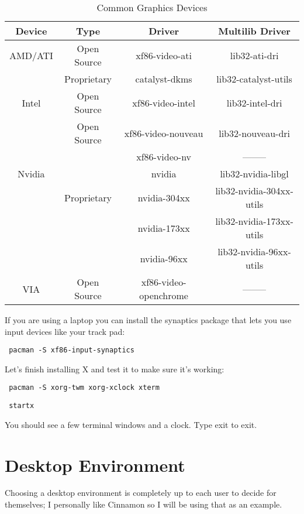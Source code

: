 \documentclass[12pt]{article}
\begin{document}
    \begin{table}[H]
        \centering
        \caption{Common Graphics Devices}
        \label{graphics_drivers}
        \begin{tabular}{|c|c|c|c|} \hline
            Device & Type & Driver & Multilib Driver \\ \hline
            AMD/ATI & Open Source & xf86-video-ati & lib32-ati-dri \\ \cline{2-4}
             & Proprietary & catalyst-dkms & lib32-catalyst-utils \\ \cline{2-4} \hline

            Intel & Open Source & xf86-video-intel & lib32-intel-dri \\ \cline{2-4} \hline

            & Open Source & xf86-video-nouveau & lib32-nouveau-dri \\ \cline{3-4}
                    & & xf86-video-nv & -------- \\ \cline{2-4}

            Nvidia & & nvidia & lib32-nvidia-libgl \\ \cline{3-4}
            & Proprietary & nvidia-304xx & lib32-nvidia-304xx-utils \\ \cline{3-4}
            & & nvidia-173xx & lib32-nvidia-173xx-utils \\ \cline{3-4}
            & & nvidia-96xx & lib32-nvidia-96xx-utils \\ \cline{3-4} \hline
            VIA & Open Source & xf86-video-openchrome & -------- \\ \hline
        \end{tabular}
    \end{table}

    If you are using a laptop you can install the synaptics package that lets
    you use input devices like your track pad:
    \begin{verbatim} pacman -S xf86-input-synaptics \end{verbatim}
    Let's finish installing X and test it to make sure it's working:
    \begin{verbatim} pacman -S xorg-twm xorg-xclock xterm \end{verbatim}
    \begin{verbatim} startx \end{verbatim}
    You should see a few terminal windows and a clock. Type exit to exit.

\section*{Desktop Environment}
    Choosing a desktop environment is completely up to each user to decide
    for themselves; I personally like Cinnamon so I will be using that as an
    example.
\end{document}
